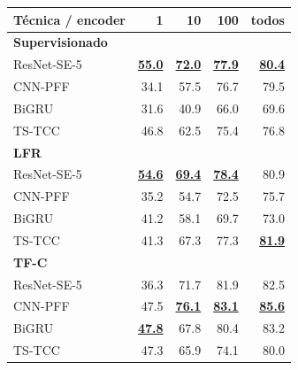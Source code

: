 \begin{tabular}{lrrrr}
\toprule
\textbf{Técnica / encoder} & \textbf{1} & \textbf{10} & \textbf{100} & \textbf{todos} \\
\midrule
\textbf{Supervisionado} &  &  &  &  \\
\quad ResNet-SE-5 & \underline{\textbf{55.0}} & \underline{\textbf{72.0}} & \underline{\textbf{77.9}} & \underline{\textbf{80.4}} \\
\quad CNN-PFF & 34.1 & 57.5 & 76.7 & 79.5 \\
\quad BiGRU & 31.6 & 40.9 & 66.0 & 69.6 \\
\quad TS-TCC & 46.8 & 62.5 & 75.4 & 76.8 \\
\textbf{LFR} &  &  &  &  \\
\quad ResNet-SE-5 & \underline{\textbf{54.6}} & \underline{\textbf{69.4}} & \underline{\textbf{78.4}} & 80.9 \\
\quad CNN-PFF & 35.2 & 54.7 & 72.5 & 75.7 \\
\quad BiGRU & 41.2 & 58.1 & 69.7 & 73.0 \\
\quad TS-TCC & 41.3 & 67.3 & 77.3 & \underline{\textbf{81.9}} \\
\textbf{TF-C} &  &  &  &  \\
\quad ResNet-SE-5 & 36.3 & 71.7 & 81.9 & 82.5 \\
\quad CNN-PFF & 47.5 & \underline{\textbf{76.1}} & \underline{\textbf{83.1}} & \underline{\textbf{85.6}} \\
\quad BiGRU & \underline{\textbf{47.8}} & 67.8 & 80.4 & 83.2 \\
\quad TS-TCC & 47.3 & 65.9 & 74.1 & 80.0 \\
\bottomrule
\end{tabular}
